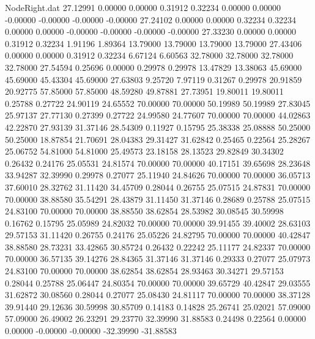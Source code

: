 \begin{filecontents}{NodeRight.dat}
  27.12991    0.00000    0.00000     0.31912    0.32234    0.00000    0.00000   -0.00000   -0.00000   -0.00000   -0.00000
  27.24102    0.00000    0.00000     0.32234    0.32234    0.00000    0.00000   -0.00000   -0.00000   -0.00000   -0.00000
  27.33230    0.00000    0.00000     0.31912    0.32234    1.91196    1.89364   13.79000   13.79000   13.79000   13.79000
  27.43406    0.00000    0.00000     0.31912    0.32234    6.67124    6.60563   32.78000   32.78000   32.78000   32.78000
  27.54594    0.25696    0.00000     0.29978    0.29978   13.47829   13.38063   45.69000   45.69000   45.43304   45.69000
  27.63803    9.25720    7.97119     0.31267    0.29978   20.91859   20.92775   57.85000   57.85000   48.59280   49.87881
  27.73951   19.80011   19.80011     0.25788    0.27722   24.90119   24.65552   70.00000   70.00000   50.19989   50.19989
  27.83045   25.97137   27.77130     0.27399    0.27722   24.99580   24.77607   70.00000   70.00000   44.02863   42.22870
  27.93139   31.37146   28.54309     0.11927    0.15795   25.38338   25.08888   50.25000   50.25000   18.87854   21.70691
  28.04383   29.31427   31.62842     0.25465    0.22564   25.28267   25.06752   54.81000   54.81000   25.49573   23.18158
  28.13523   29.82849   30.34302     0.26432    0.24176   25.05531   24.81574   70.00000   70.00000   40.17151   39.65698
  28.23648   33.94287   32.39990     0.29978    0.27077   25.11940   24.84626   70.00000   70.00000   36.05713   37.60010
  28.32762   31.11420   34.45709     0.28044    0.26755   25.07515   24.87831   70.00000   70.00000   38.88580   35.54291
  28.43879   31.11450   31.37146     0.28689    0.25788   25.07515   24.83100   70.00000   70.00000   38.88550   38.62854
  28.53982   30.08545   30.59998     0.16762    0.15795   25.05989   24.82032   70.00000   70.00000   39.91455   39.40002
  28.63103   29.57153   31.11420     0.26755    0.24176   25.05226   24.82795   70.00000   70.00000   40.42847   38.88580
  28.73231   33.42865   30.85724     0.26432    0.22242   25.11177   24.82337   70.00000   70.00000   36.57135   39.14276
  28.84365   31.37146   31.37146     0.29333    0.27077   25.07973   24.83100   70.00000   70.00000   38.62854   38.62854
  28.93463   30.34271   29.57153     0.28044    0.25788   25.06447   24.80354   70.00000   70.00000   39.65729   40.42847
  29.03555   31.62872   30.08560     0.28044    0.27077   25.08430   24.81117   70.00000   70.00000   38.37128   39.91440
  29.12636   30.59998   30.85709     0.14183    0.14828   25.26741   25.02021   57.09000   57.09000   26.49002   26.23291
  29.23770   32.39990   31.88583     0.24498    0.22564    0.00000    0.00000   -0.00000   -0.00000  -32.39990  -31.88583

\end{filecontents}
